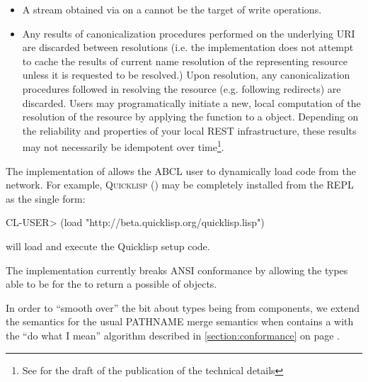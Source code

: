 \documentclass[10pt]{book}
\begin{document}
\begin{itemize}

\item A stream obtained via  on a 
  cannot be the target of write operations.

\item Any results of canonicalization procedures performed on the
  underlying \textsc{URI} are discarded between resolutions (i.e. the
  implementation does not attempt to cache the results of current name
  resolution of the representing resource unless it is requested to be
  resolved.)  Upon resolution, any canonicalization procedures
  followed in resolving the resource (e.g. following redirects) are
  discarded.  Users may programatically initiate a new, local
  computation of the resolution of the resource by applying the
   function to a  object.
  Depending on the reliability and properties of your local
  \textsc{REST} infrastructure, these results may not necessarily be
  idempotent over time\footnote {See \cite{evenson2011} for the draft
    of the publication of the technical details}.

\end{itemize}

The implementation of  allows the \textsc{ABCL}
user to dynamically load code from the network.  For example,
\textsc{Quicklisp} (\cite{quicklisp}) may be completely installed from
the \textsc{REPL} as the single form:

\begin{listing-lisp}
  CL-USER> (load "http://beta.quicklisp.org/quicklisp.lisp")
\end{listing-lisp}

will load and execute the Quicklisp setup code.

The implementation currently breaks \textsc{ANSI} conformance by allowing the
types able to be  for the  to return a possible  of
 objects.  %

In order to ``smooth over'' the bit about types being 
from  components, we extend the semantics for the
usual PATHNAME merge semantics when 
contains a  with the ``do what I mean''
algorithm described in \ref{section:conformance} on page
\pageref{section:conformance}.

\end{document}
